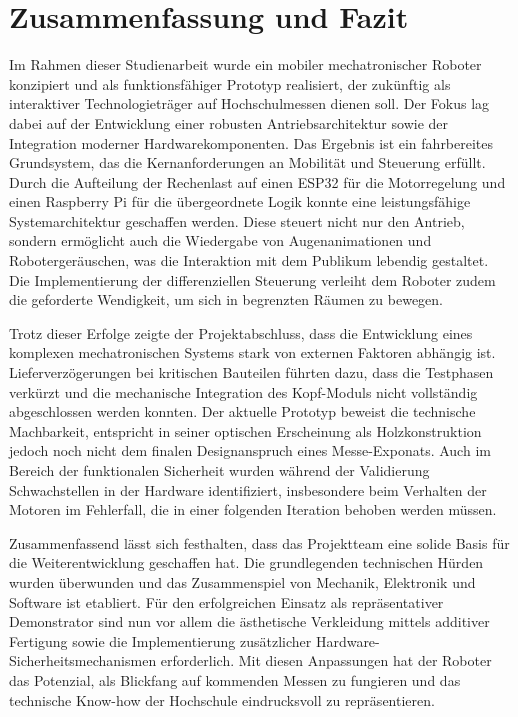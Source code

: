 \chapter{Zusammenfassung und Fazit}
\label{cha:Zusammenfassung und Fazit}

Im Rahmen dieser Studienarbeit wurde ein mobiler mechatronischer Roboter konzipiert und als funktionsfähiger Prototyp realisiert, der zukünftig als interaktiver Technologieträger auf Hochschulmessen dienen soll. Der Fokus lag dabei auf der Entwicklung einer robusten Antriebsarchitektur sowie der Integration moderner Hardwarekomponenten. Das Ergebnis ist ein fahrbereites Grundsystem, das die Kernanforderungen an Mobilität und Steuerung erfüllt. Durch die Aufteilung der Rechenlast auf einen ESP32 für die Motorregelung und einen Raspberry Pi für die übergeordnete Logik konnte eine leistungsfähige Systemarchitektur geschaffen werden. Diese steuert nicht nur den Antrieb, sondern ermöglicht auch die Wiedergabe von Augenanimationen und Robotergeräuschen, was die Interaktion mit dem Publikum lebendig gestaltet. Die Implementierung der differenziellen Steuerung verleiht dem Roboter zudem die geforderte Wendigkeit, um sich in begrenzten Räumen zu bewegen.

Trotz dieser Erfolge zeigte der Projektabschluss, dass die Entwicklung eines komplexen mechatronischen Systems stark von externen Faktoren abhängig ist. Lieferverzögerungen bei kritischen Bauteilen führten dazu, dass die Testphasen verkürzt und die mechanische Integration des Kopf-Moduls nicht vollständig abgeschlossen werden konnten. Der aktuelle Prototyp beweist die technische Machbarkeit, entspricht in seiner optischen Erscheinung als Holzkonstruktion jedoch noch nicht dem finalen Designanspruch eines Messe-Exponats. Auch im Bereich der funktionalen Sicherheit wurden während der Validierung Schwachstellen in der Hardware identifiziert, insbesondere beim Verhalten der Motoren im Fehlerfall, die in einer folgenden Iteration behoben werden müssen.

Zusammenfassend lässt sich festhalten, dass das Projektteam eine solide Basis für die Weiterentwicklung geschaffen hat. Die grundlegenden technischen Hürden wurden überwunden und das Zusammenspiel von Mechanik, Elektronik und Software ist etabliert. Für den erfolgreichen Einsatz als repräsentativer Demonstrator sind nun vor allem die ästhetische Verkleidung mittels additiver Fertigung sowie die Implementierung zusätzlicher Hardware-Sicherheitsmechanismen erforderlich. Mit diesen Anpassungen hat der Roboter das Potenzial, als Blickfang auf kommenden Messen zu fungieren und das technische Know-how der Hochschule eindrucksvoll zu repräsentieren.







